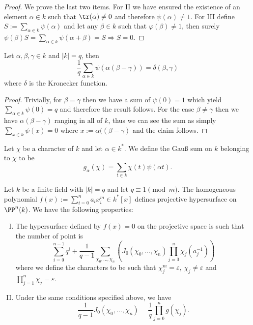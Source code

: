 \begin{proof}
   We prove the last two items. For II we have ensured the existence of an
   element \(\alpha \in k\) such that \(\tr(\alpha) \neq  0\) and therefore
   \(\psi(\alpha) \neq  1\). For III define \(S := \sum_{\alpha \in
   k}\psi(\alpha)\) and let any \(\beta \in k\) such that \(\varphi(\beta) \neq
   1\), then surely \(\psi(\beta) S = \sum_{\alpha \in k} \psi(\alpha + \beta) =
   S \Rightarrow S = 0\).
\end{proof}

\begin{proposition}
   Let \(\alpha,\beta,\gamma \in k\) and \(|k| = q\), then
   \[
      \frac{1}{q} \sum_{\alpha \in k} \psi(\alpha(\beta - \gamma)) =
      \delta(\beta, \gamma)
   \] 
   where \(\delta\) is the Kronecker function.
\end{proposition}

\begin{proof}
   Trivially, for \(\beta = \gamma\) then we have a sum of \(\psi(0) = 1\) which
   yield  \(\sum_{\alpha \in k} \psi(0) = q\) and therefore the result follows.
   For the case \(\beta\neq\gamma\) then we have \(\alpha(\beta - \gamma)\) 
   ranging in all of \(k\), thus we can see the sum as simply  \(\sum_{x \in k}
   \psi(x) = 0\) where \(x := \alpha((\beta - \gamma)\) and the claim follows.
\end{proof}

\begin{definition}
   Let \(\chi\) be a character of \(k\) and let \(\alpha \in k^\ast\). We define
   the Gau{\ss} sum on \(k\) belonging to \(\chi\) to be 
   \[
      g_\alpha(\chi) = \sum_{t \in k} \chi(t) \psi(\alpha t).
   \] 
\end{definition}

\begin{theorem}
   Let \(k\) be a finite field with \(|k| = q \) and let \(q \equiv 1
   \pmod{m}\). The homogeneous polynomial \(f(x) := \sum_{i=0}^{n} a_i x_i^{m}
   \in k^\ast[x]\) defines projective hypersurface on \(\PP^{n}(k)\). We have
   the following properties:
   \begin{enumerate}[I.]
      \item The hypersurface defined by \(f(x) = 0\) on the projective space is
         such that the number of point is
         \[
            \sum_{i=0}^{n-1} q^i + \frac{1}{q-1} \sum_{\chi_0,\dots,\chi_n}
            \left( J_0(\chi_0,\dots,\chi_n)\prod_{j=0}^{n} \chi_j(a_j^{-1})
            \right) 
         \] 
         where we define the characters to be such that \(\chi_j^m =
         \varepsilon,\ \chi_j \neq  \varepsilon\) and \(\prod_{j=1}^n \chi_j =
         \varepsilon\).
      \item Under the same conditions specified above, we have
         \[
            \frac{1}{q-1} J_0(\chi_0,\dots,\chi_n) = \frac{1}{q} \prod_{j=0}^{n}
            g(\chi_j).
         \] 
   \end{enumerate}
\end{theorem}

